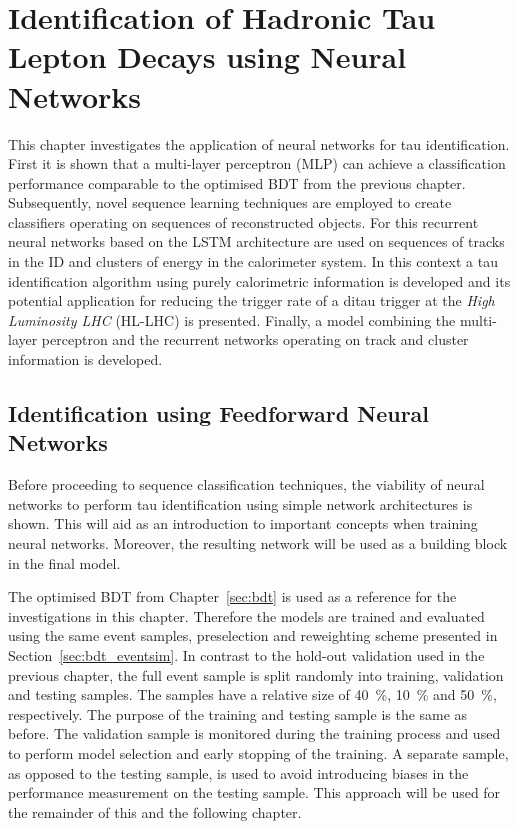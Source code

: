 \chapter{Identification of Hadronic Tau Lepton Decays using Neural Networks}
\label{sec:rnn}

This chapter investigates the application of neural networks for tau
identification. First it is shown that a multi-layer perceptron (MLP) can
achieve a classification performance comparable to the optimised BDT from the
previous chapter. Subsequently, novel sequence learning techniques are employed
to create classifiers operating on sequences of reconstructed objects. For this
recurrent neural networks based on the LSTM architecture are used on sequences
of tracks in the ID and clusters of energy in the calorimeter system. In this
context a tau identification algorithm using purely calorimetric information is
developed and its potential application for reducing the trigger rate of a
ditau trigger at the \emph{High Luminosity LHC} (HL-LHC) is presented. Finally,
a model combining the multi-layer perceptron and the recurrent networks
operating on track and cluster information is developed.

\section{Identification using Feedforward Neural Networks}
\label{sec:ffnn_id}

Before proceeding to sequence classification techniques, the viability of neural
networks to perform tau identification using simple network architectures is
shown. This will aid as an introduction to important concepts when training
neural networks. Moreover, the resulting network will be used as a building
block in the final model.

The optimised BDT from Chapter~\ref{sec:bdt} is used as a reference for the
investigations in this chapter. Therefore the models are trained and evaluated
using the same event samples, preselection and reweighting scheme presented in
Section~\ref{sec:bdt_eventsim}. In contrast to the hold-out validation used in
the previous chapter, the full event sample is split randomly into training,
validation and testing samples. The samples have a relative size of
\SI{40}{\percent}, \SI{10}{\percent} and \SI{50}{\percent}, respectively. The
purpose of the training and testing sample is the same as before. The validation
sample is monitored during the training process and used to perform model
selection and early stopping of the training. A separate sample, as opposed to
the testing sample, is used to avoid introducing biases in the performance
measurement on the testing sample. This approach will be used for the remainder
of this and the following chapter.

